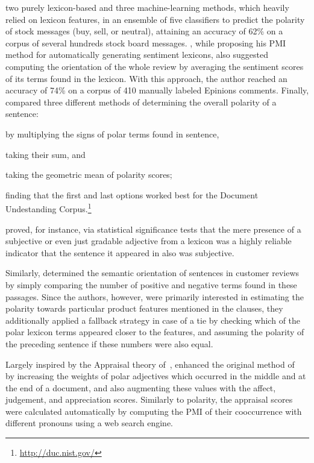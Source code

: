 two purely lexicon-based and three machine-learning
methods, which heavily relied on lexicon features, in an ensemble of
five classifiers to predict the polarity of stock messages (buy, sell,
or neutral), attaining an accuracy of 62\% on a corpus of several
hundreds stock board messages.  \citet{Turney:02}, while proposing his
PMI method for automatically generating sentiment lexicons, also
suggested computing the orientation of the whole review by averaging
the sentiment scores of its terms found in the lexicon.  With this
approach, the author reached an accuracy of 74\% on a corpus of 410
manually labeled Epinions comments.  Finally, \citet{Kim:04} compared
three different methods of determining the overall polarity of a
sentence:
\begin{inparaenum}[(i)]
  \item by multiplying the signs of polar terms found in sentence,
  \item taking their sum, and
  \item taking the geometric mean of polarity scores;
\end{inparaenum}
finding that the first and last options worked best for the Document
Undestanding Corpus.\footnote{\url{http://duc.nist.gov/}}

\citet{Hatzivassi:00} proved, for instance, via statistical
significance tests that the mere presence of a subjective or even just
gradable adjective from a lexicon was a highly reliable indicator that
the sentence it appeared in also was subjective.

Similarly, \citet{Hu:04} determined the semantic orientation of
sentences in customer reviews by simply comparing the number of
positive and negative terms found in these passages. Since the
authors, however, were primarily interested in estimating the polarity
towards particular product features mentioned in the clauses, they
additionally applied a fallback strategy in case of a tie by checking
which of the polar lexicon terms appeared closer to the features, and
assuming the polarity of the preceding sentence if these numbers were
also equal.

Largely inspired by the Appraisal theory of~\citet{Martin:00},
\citet{Taboada:04} enhanced the original method of~\citet{Turney:02}
by increasing the weights of polar adjectives which occurred in the
middle and at the end of a document, and also augmenting these values
with the affect, judgement, and appreciation scores.  Similarly to
polarity, the appraisal scores were calculated automatically by
computing the PMI of their cooccurrence with different pronouns using
a web search engine.

